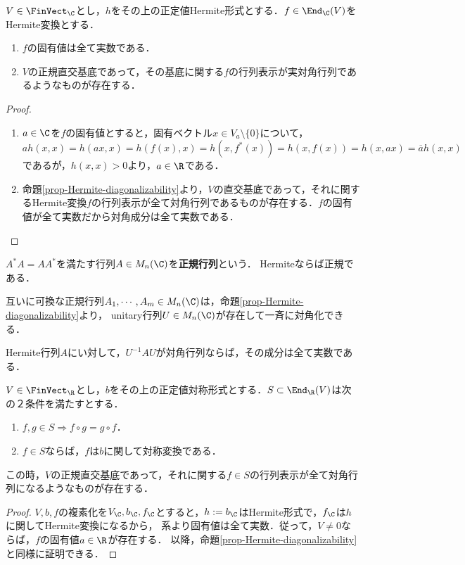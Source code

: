 \documentclass[uplatex, dvipdfmx]{jsreport}
\begin{document}
\begin{corollary}[Hermite変換の対角化]
    $V\in\FinVect_\C$とし，$h$をその上の正定値Hermite形式とする．$f\in\End_\C(V)$をHermite変換とする．
    \begin{enumerate}
        \item $f$の固有値は全て実数である．
        \item $V$の正規直交基底であって，その基底に関する$f$の行列表示が実対角行列であるようなものが存在する．
    \end{enumerate}
\end{corollary}
\begin{proof}\mbox{}
    \begin{enumerate}
        \item $a\in\C$を$f$の固有値とすると，固有ベクトル$x\in V_a\setminus\{0\}$について，$ah(x,x)=h(ax,x)=h(f(x),x)=h(x,f^*(x))=h(x,f(x))=h(x,ax)=\overline{a}h(x,x)$であるが，$h(x,x)>0$より，$a\in\R$である．
        \item 命題\ref{prop-Hermite-diagonalizability}より，$V$の直交基底であって，それに関するHermite変換$f$の行列表示が全て対角行列であるものが存在する．$f$の固有値が全て実数だから対角成分は全て実数である．
    \end{enumerate}
\end{proof}

\begin{example}
    $A^*A=AA^*$を満たす行列$A\in M_n(\C)$を\textbf{正規行列}という．
    Hermiteならば正規である．

    互いに可換な正規行列$A_1,\cdots,A_m\in M_n(\C)$は，命題\ref{prop-Hermite-diagonalizability}より，
    unitary行列$U\in M_n(\C)$が存在して一斉に対角化できる．
\end{example}

\begin{remark}
    Hermite行列$A$にい対して，$U^{-1}AU$が対角行列ならば，その成分は全て実数である．
\end{remark}

\begin{proposition}[対称変換の対角化]
    $V\in\FinVect_\R$とし，$b$をその上の正定値対称形式とする．$S\subset\End_\R(V)$は次の２条件を満たすとする．
    \begin{enumerate}[(1)]
        \item $f,g\in S\Rightarrow f\circ g=g\circ f$．
        \item $f\in S$ならば，$f$は$b$に関して対称変換である．
    \end{enumerate}
    この時，$V$の正規直交基底であって，それに関する$f\in S$の行列表示が全て対角行列になるようなものが存在する．
\end{proposition}
\begin{proof}
    $V,b,f$の複素化を$V_\C,b_\C,f_\C$とすると，$h:=b_\C$はHermite形式で，$f_\C$は$h$に関してHermite変換になるから，
    系より固有値は全て実数．従って，$V\ne 0$ならば，$f$の固有値$a\in\R$が存在する．
    以降，命題\ref{prop-Hermite-diagonalizability}と同様に証明できる．
\end{proof}
\end{document}
